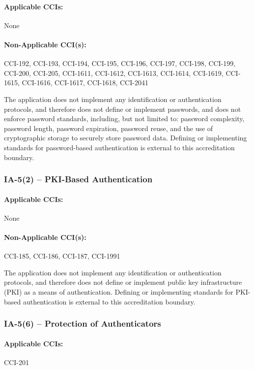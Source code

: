 \documentclass[letterpaper, 10pt, twoside]{article}
\begin{document}
\paragraph{Applicable CCIs:} None

\paragraph{Non-Applicable CCI(s):} CCI-192, CCI-193, CCI-194, CCI-195, CCI-196, CCI-197, CCI-198, CCI-199, CCI-200, CCI-205, CCI-1611, CCI-1612, CCI-1613, CCI-1614, CCI-1619, CCI-1615, CCI-1616, CCI-1617, CCI-1618, CCI-2041

The application does not implement any identification or authentication protocols, and therefore does not define or implement passwords, and does not enforce password standards, including, but not limited to: password complexity, password length, password expiration, password reuse, and the use of cryptographic storage to securely store password data. Defining or implementing standards for password-based authentication is external to this accreditation boundary.

\subsubsection{IA-5(2) -- PKI-Based Authentication}

\paragraph{Applicable CCIs:} None

\paragraph{Non-Applicable CCI(s):} CCI-185, CCI-186, CCI-187, CCI-1991

The application does not implement any identification or authentication protocols, and therefore does not define or implement public key infrastructure (PKI) as a means of authentication. Defining or implementing standards for PKI-based authentication is external to this accreditation boundary.

\subsubsection{IA-5(6) -- Protection of Authenticators}

\paragraph{Applicable CCIs:} CCI-201
\end{document}
